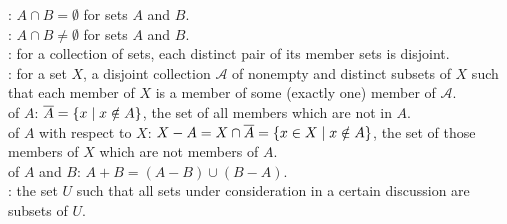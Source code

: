 \documentclass[12pt]{book}
\begin{document}
: $A \cap B = \emptyset$ for sets $A$ and $B$.\\
: $A \cap B \neq \emptyset$ for sets $A$ and $B$.\\
: for a collection of sets, each distinct pair of its member sets is disjoint.\\
: for a set $X$, a disjoint collection $\mathcal{A}$ of nonempty and distinct subsets of $X$ such that each member of $X$ is a member of some (exactly one) member of $\mathcal{A}$.\\
 of $A$: $\overline{A} = \{x \mid x \notin A\}$, the set of all members which are not in $A$.\\
 of $A$ with respect to $X$: $X - A = X \cap \overline{A} = \{x \in X \mid x \notin A\}$, the set of those members of $X$ which are not members of $A$.\\
 of $A$ and $B$: $A + B = (A - B) \cup (B - A)$.\\
: the set $U$ such that all sets under consideration in a certain discussion are subsets of $U$.\\

\newpage
\end{document}
